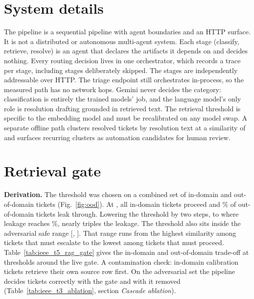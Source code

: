 \documentclass[conference,onecolumn,a4paper]{IEEEtran}
\begin{document}
\section{System details}
The pipeline is a sequential pipeline with agent boundaries and an HTTP surface. It is not a distributed or autonomous multi-agent system. Each stage (classify, retrieve, resolve) is an agent that declares the artifacts it depends on and decides nothing. Every routing decision lives in one orchestrator, which records a trace per stage, including stages deliberately skipped. The stages are independently addressable over HTTP. The triage endpoint still orchestrates in-process, so the measured path has no network hops. Gemini never decides the category: classification is entirely the trained models' job, and the language model's only role is resolution drafting grounded in retrieved text. The retrieval threshold is specific to the embedding model and must be recalibrated on any model swap. A separate offline path clusters resolved tickets by resolution text at a similarity of  and surfaces recurring clusters as automation candidates for human review.

\section{Retrieval gate}
\textbf{Derivation.} The threshold was chosen on a combined set of in-domain and out-of-domain tickets (Fig.~\ref{fig:ood}). At , all  in-domain tickets proceed and \% of out-of-domain tickets leak through. Lowering the threshold by two steps, to where leakage reaches \%, nearly triples the leakage. The threshold also sits inside the adversarial safe range [, ]. That range runs from the highest similarity among tickets that must escalate to the lowest among tickets that must proceed. Table~\ref{tab:ieee_t5_rag_gate} gives the in-domain and out-of-domain trade-off at thresholds around the live gate. A contamination check:  in-domain calibration tickets retrieve their own source row first. On the adversarial set the pipeline decides  tickets correctly with the gate and  with it removed (Table~\ref{tab:ieee_t3_ablation}, section \emph{Cascade ablation}).
\end{document}
